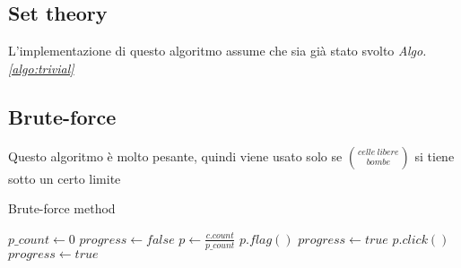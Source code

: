\documentclass{article}
\begin{document}
\newpage
\subsection{Set theory}
L'implementazione di questo algoritmo assume che sia già stato svolto \textit{Algo.\ref{algo:trivial}}

\newpage
\subsection{Brute-force}
Questo algoritmo è molto pesante, quindi viene usato solo se $\binom{celle\ libere}{bombe}$ si tiene sotto un certo limite
\begin{algorithm}
    \caption{Brute-force method}
    $p\_count \gets 0$\;
    $progress \gets false$\;
     {
        $p \gets \frac{c.count}{p\_count}$\;
         {
            $p.flag()$ 
            $progress \gets true$\;
        }
         {
            $p.click()$ 
            $progress \gets true$\;
        }
    }
\end{algorithm}
\end{document}
